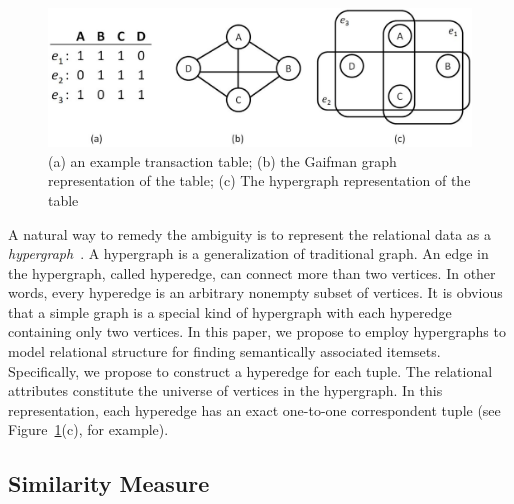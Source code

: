 \begin{figure}[tbh]
\begin{center}
\includegraphics[width=.8\textwidth]{fig/hg_and_rg1.eps}
\end{center}
\caption{\label{fig:hg_and_rg} (a) an example transaction table; (b) the Gaifman graph representation of the table; (c) The hypergraph representation of the table}
\end{figure}

A natural way to remedy the ambiguity is to represent the relational data as a \emph{hypergraph}~\cite{Hypergraph}. A hypergraph is a generalization of traditional graph. An edge in the hypergraph, called hyperedge, can connect more than two vertices. In other words, every hyperedge is an arbitrary nonempty subset of vertices. It is obvious that a simple graph is a special kind of hypergraph with each hyperedge containing only two vertices. In this paper, we propose to employ hypergraphs to model relational structure for finding semantically associated itemsets. Specifically, we propose to construct a hyperedge for each tuple. The relational attributes constitute the universe of vertices in the hypergraph. In this representation, each hyperedge has an exact one-to-one correspondent tuple (see Figure~\ref{fig:hg_and_rg}(c), for example).

\subsection{Similarity Measure}

